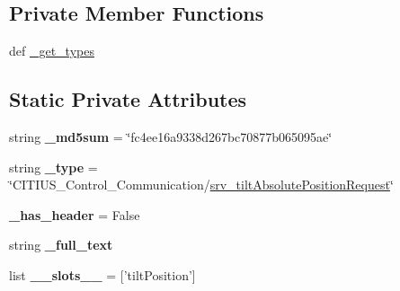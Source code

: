 \subsection*{\-Private \-Member \-Functions}
\begin{DoxyCompactItemize}
\item 
def \hyperlink{class_c_i_t_i_u_s___control___communication_1_1srv_1_1__srv__tilt_absolute_position_1_1srv__tilt_absolute_position_request_a4f90f68c6dda4e5d983d8a984e5767c8}{\-\_\-get\-\_\-types}
\end{DoxyCompactItemize}
\subsection*{\-Static \-Private \-Attributes}
\begin{DoxyCompactItemize}
\item 
\hypertarget{class_c_i_t_i_u_s___control___communication_1_1srv_1_1__srv__tilt_absolute_position_1_1srv__tilt_absolute_position_request_ac28fafdaa64a775fbe2f9e5f3e3b3488}{string {\bfseries \-\_\-md5sum} = \char`\"{}fc4ee16a9338d267bc70877b065095ae\char`\"{}}\label{class_c_i_t_i_u_s___control___communication_1_1srv_1_1__srv__tilt_absolute_position_1_1srv__tilt_absolute_position_request_ac28fafdaa64a775fbe2f9e5f3e3b3488}

\item 
\hypertarget{class_c_i_t_i_u_s___control___communication_1_1srv_1_1__srv__tilt_absolute_position_1_1srv__tilt_absolute_position_request_aa00e6cdad8f80af9c46578bb5516281c}{string {\bfseries \-\_\-type} = \char`\"{}\-C\-I\-T\-I\-U\-S\-\_\-\-Control\-\_\-\-Communication/\hyperlink{class_c_i_t_i_u_s___control___communication_1_1srv_1_1__srv__tilt_absolute_position_1_1srv__tilt_absolute_position_request}{srv\-\_\-tilt\-Absolute\-Position\-Request}\char`\"{}}\label{class_c_i_t_i_u_s___control___communication_1_1srv_1_1__srv__tilt_absolute_position_1_1srv__tilt_absolute_position_request_aa00e6cdad8f80af9c46578bb5516281c}

\item 
\hypertarget{class_c_i_t_i_u_s___control___communication_1_1srv_1_1__srv__tilt_absolute_position_1_1srv__tilt_absolute_position_request_a0a8b71889c50e0368e9174840f3a8fe2}{{\bfseries \-\_\-has\-\_\-header} = \-False}\label{class_c_i_t_i_u_s___control___communication_1_1srv_1_1__srv__tilt_absolute_position_1_1srv__tilt_absolute_position_request_a0a8b71889c50e0368e9174840f3a8fe2}

\item 
string {\bfseries \-\_\-full\-\_\-text}
\item 
\hypertarget{class_c_i_t_i_u_s___control___communication_1_1srv_1_1__srv__tilt_absolute_position_1_1srv__tilt_absolute_position_request_a89a407fcf80e8a2bb5a249dd4f8ac906}{list {\bfseries \-\_\-\-\_\-slots\-\_\-\-\_\-} = \mbox{[}'tilt\-Position'\mbox{]}}\label{class_c_i_t_i_u_s___control___communication_1_1srv_1_1__srv__tilt_absolute_position_1_1srv__tilt_absolute_position_request_a89a407fcf80e8a2bb5a249dd4f8ac906}


\end{DoxyCompactItemize}
